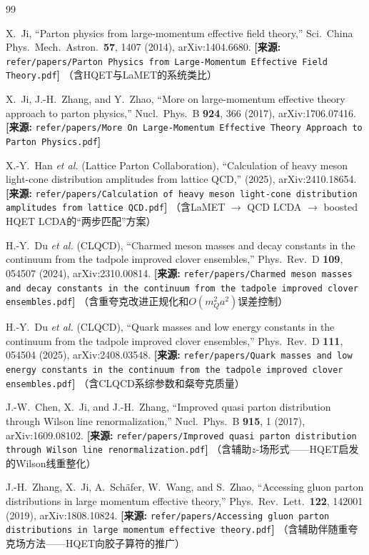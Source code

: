 \documentclass[12pt,a4paper]{ctexart}
\theoremstyle{definition}
\begin{document}
\begin{thebibliography}{99}

X.~Ji,
``Parton physics from large-momentum effective field theory,''
Sci.\ China Phys.\ Mech.\ Astron.\ \textbf{57}, 1407 (2014), arXiv:1404.6680.
\quad\textbf{[来源:} \texttt{refer/papers/Parton Physics from Large-Momentum Effective Field Theory.pdf}\textbf{]}
（含HQET与LaMET的系统类比）

X.~Ji, J.-H.~Zhang, and Y.~Zhao,
``More on large-momentum effective theory approach to parton physics,''
Nucl.\ Phys.\ B \textbf{924}, 366 (2017), arXiv:1706.07416.
\quad\textbf{[来源:} \texttt{refer/papers/More On Large-Momentum Effective Theory Approach to Parton Physics.pdf}\textbf{]}

X.-Y.~Han \textit{et al.} (Lattice Parton Collaboration),
``Calculation of heavy meson light-cone distribution amplitudes from lattice QCD,''
(2025), arXiv:2410.18654.
\quad\textbf{[来源:} \texttt{refer/papers/Calculation of heavy meson light-cone distribution amplitudes from lattice QCD.pdf}\textbf{]}
（含LaMET $\to$ QCD LCDA $\to$ boosted HQET LCDA的``两步匹配''方案）

H.-Y.~Du \textit{et al.} (CLQCD),
``Charmed meson masses and decay constants in the continuum from the tadpole improved clover ensembles,''
Phys.\ Rev.\ D \textbf{109}, 054507 (2024), arXiv:2310.00814.
\quad\textbf{[来源:} \texttt{refer/papers/Charmed meson masses and decay constants in the continuum from the tadpole improved clover ensembles.pdf}\textbf{]}
（含重夸克改进正规化和$O(m^2_Q a^2)$误差控制）

H.-Y.~Du \textit{et al.} (CLQCD),
``Quark masses and low energy constants in the continuum from the tadpole improved clover ensembles,''
Phys.\ Rev.\ D \textbf{111}, 054504 (2025), arXiv:2408.03548.
\quad\textbf{[来源:} \texttt{refer/papers/Quark masses and low energy constants in the continuum from the tadpole improved clover ensembles.pdf}\textbf{]}
（含CLQCD系综参数和粲夸克质量）

J.-W.~Chen, X.~Ji, and J.-H.~Zhang,
``Improved quasi parton distribution through Wilson line renormalization,''
Nucl.\ Phys.\ B \textbf{915}, 1 (2017), arXiv:1609.08102.
\quad\textbf{[来源:} \texttt{refer/papers/Improved quasi parton distribution through Wilson line renormalization.pdf}\textbf{]}
（含辅助$z$-场形式——HQET启发的Wilson线重整化）

J.-H.~Zhang, X.~Ji, A.~Sch\"afer, W.~Wang, and S.~Zhao,
``Accessing gluon parton distributions in large momentum effective theory,''
Phys.\ Rev.\ Lett.\ \textbf{122}, 142001 (2019), arXiv:1808.10824.
\quad\textbf{[来源:} \texttt{refer/papers/Accessing gluon parton distributions in large momentum effective theory.pdf}\textbf{]}
（含辅助伴随重夸克场方法——HQET向胶子算符的推广）


\end{thebibliography}
\end{document}
